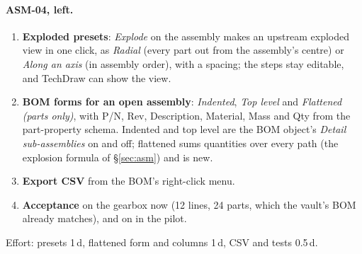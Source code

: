 \paragraph{ASM-04, left.}
\begin{enumerate}[nosep]
  \item \textbf{Exploded presets}: \emph{Explode} on the assembly makes an upstream exploded view in one click, as
        \emph{Radial} (every part out from the assembly's centre) or \emph{Along an axis} (in assembly order), with
        a spacing; the steps stay editable, and TechDraw can show the view.
  \item \textbf{BOM forms for an open assembly}: \emph{Indented}, \emph{Top level} and \emph{Flattened (parts
        only)}, with P/N, Rev, Description, Material, Mass and Qty from the part-property schema. Indented and top level
        are the BOM object's \emph{Detail sub-assemblies} on and off; flattened sums quantities over every path
        (the explosion formula of \S\ref{sec:asm}) and is new.
  \item \textbf{Export CSV} from the BOM's right-click menu.
  \item \textbf{Acceptance} on the gearbox  now (12 lines, 24 parts, which the vault's BOM already
        matches), and on  in the  pilot.
\end{enumerate}
Effort: presets 1\,d, flattened form and columns 1\,d, CSV and tests 0.5\,d.

